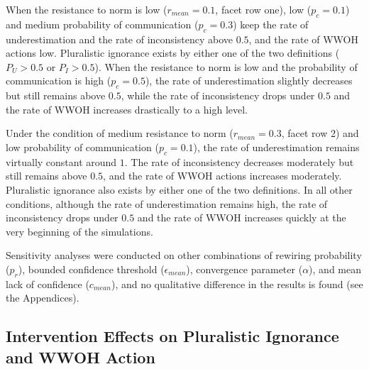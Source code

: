 \documentclass[
  11pt,
]{article}
\begin{document}
\endgroup

When the resistance to norm is low (\(r_{mean} = 0.1\), facet row one),
low (\(p_c = 0.1\)) and medium probability of communication
(\(p_c = 0.3\)) keep the rate of underestimation and the rate of
inconsistency above \(0.5\), and the rate of WWOH actions low.
Pluralistic ignorance exists by either one of the two definitions
(\(P_U > 0.5\) or \(P_I > 0.5\)). When the resistance to norm is low and
the probability of communication is high (\(p_c = 0.5\)), the rate of
underestimation slightly decreases but still remains above \(0.5\),
while the rate of inconsistency drops under \(0.5\) and the rate of WWOH
increases drastically to a high level.

Under the condition of medium resistance to norm (\(r_{mean} = 0.3\),
facet row 2) and low probability of communication (\(p_c = 0.1\)), the
rate of underestimation remains virtually constant around \(1\). The
rate of inconsistency decreases moderately but still remains above
\(0.5\), and the rate of WWOH actions increases moderately. Pluralistic
ignorance also exists by either one of the two definitions. In all other
conditions, although the rate of underestimation remains high, the rate
of inconsistency drops under \(0.5\) and the rate of WWOH increases
quickly at the very beginning of the simulations.

Sensitivity analyses were conducted on other combinations of rewiring
probability (\(p_r\)), bounded confidence threshold
(\(\epsilon_{mean}\)), convergence parameter (\(\alpha\)), and mean lack
of confidence (\(c_{mean}\)), and no qualitative difference in the
results is found (see the Appendices).

\hypertarget{intervention-effects-on-pluralistic-ignorance-and-wwoh-action}{%
\subsection{Intervention Effects on Pluralistic Ignorance and WWOH
Action}\label{intervention-effects-on-pluralistic-ignorance-and-wwoh-action}}
\end{document}
